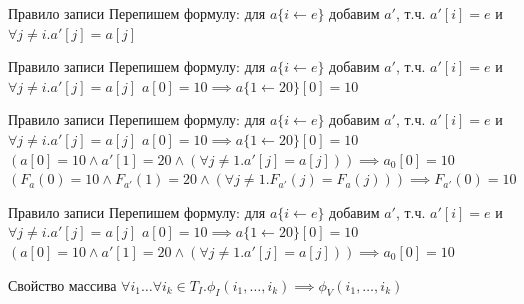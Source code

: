 \documentclass{beamer}
\begin{document}
\begin{frame}{Правило записи}
Перепишем формулу:\newline
для $a\{i\leftarrow e\}$ добавим $a'$, т.ч. $a'[i] = e$ и $\forall j\ne i. a'[j] = a[j]$\newline
\end{frame}

\begin{frame}{Правило записи}
Перепишем формулу:\newline
для $a\{i\leftarrow e\}$ добавим $a'$, т.ч. $a'[i] = e$ и $\forall j\ne i. a'[j] = a[j]$\newline
$a[0] = 10 \implies a\{1 \leftarrow 20\}[0] = 10$\newline
\end{frame}

\begin{frame}{Правило записи}
Перепишем формулу:\newline
для $a\{i\leftarrow e\}$ добавим $a'$, т.ч. $a'[i] = e$ и $\forall j\ne i. a'[j] = a[j]$\newline
$a[0] = 10 \implies a\{1 \leftarrow 20\}[0] = 10$\newline
$(a[0] = 10 \wedge a'[1] = 20 \wedge (\forall j \ne 1. a'[j] = a[j])) \implies a_0[0] = 10$\newline
$(F_a(0) = 10 \wedge F_{a'}(1) = 20 \wedge (\forall j \ne 1. F_{a'}(j) = F_a(j))) \implies F_{a'}(0) = 10$\newline
\end{frame}

\begin{frame}{Правило записи}
Перепишем формулу:\newline
для $a\{i\leftarrow e\}$ добавим $a'$, т.ч. $a'[i] = e$ и $\forall j\ne i. a'[j] = a[j]$\newline
$a[0] = 10 \implies a\{1 \leftarrow 20\}[0] = 10$\newline
$(a[0] = 10 \wedge a'[1] = 20 \wedge (\forall j \ne 1. a'[j] = a[j])) \implies a_0[0] = 10$\newline
\end{frame}

\begin{frame}{Свойство массива}
$\forall i_1 \dots \forall i_k \in T_I. \phi_I(i_1, \dots, i_k) \implies \phi_V(i_1, \dots, i_k)$\newline
\end{frame}
\end{document}
